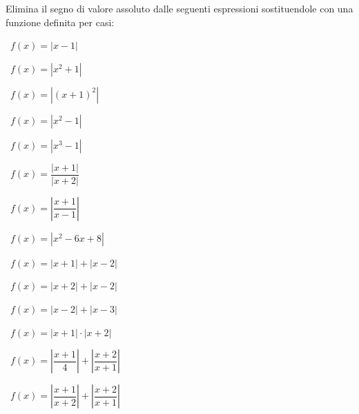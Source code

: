 \begin{esercizio}
\label{ese:1.10}
Elimina il segno di valore assoluto dalle seguenti espressioni 
sostituendole con una funzione definita per casi:
\begin{htmulticols}{2}
\begin{enumeratea}
\item~\(f(x)=\left|x-1\right|\)
\item~\(f(x)=\left|x^2+1\right|\)
\item~\(f(x)=\left|(x+1)^2\right|\)
\item~\(f(x)=\left|x^2-1\right|\)
\item~\(f(x)=\left|x^3-1\right|\)
\item~\(f(x)=\dfrac{\left|x+1\right|}{\left|x+2\right|}\)
\item~\(f(x)=\left|\dfrac{x+1}{x-1}\right|\)
\item~\(f(x)=\left|x^2-6x+8\right|\)
\item~\(f(x)=\left|x+1\right|+\left|x-2\right|\)
\item~\(f(x)=\left|x+2\right|+\left|x-2\right|\)
\item~\(f(x)=\left|x-2\right|+\left|x-3\right|\)
\item~\(f(x)=\left|x+1\right|\cdot \left|x+2\right|\)
\item~\(f(x)=\left|\dfrac{x+1} 4\right|+\left|\dfrac{x+2}{x+1}\right|\)
\item~\(f(x)=\left|\dfrac{x+1}{x+2}\right|+\left|\dfrac{x+2}{x+1}\right|\)
\end{enumeratea}
\end{htmulticols}
\end{esercizio}

\subsubsection*{}


